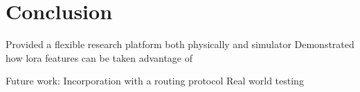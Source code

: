 \chapter{Conclusion}
Provided a flexible research platform both physically and simulator
Demonstrated how lora features can be taken advantage of

Future work:
Incorporation with a routing protocol
Real world testing
